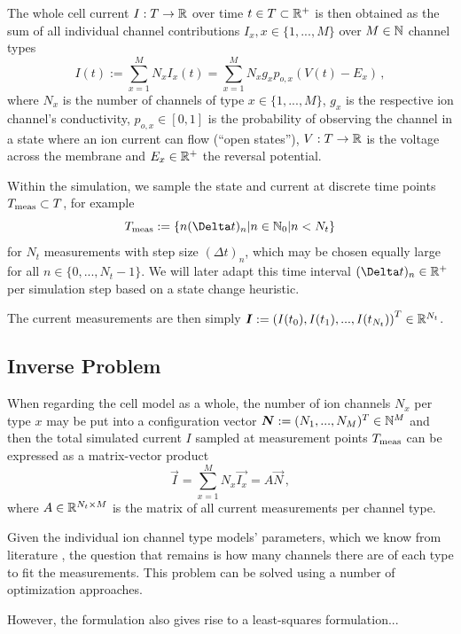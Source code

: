 \documentclass[USenglish,twocolumn]{article}
\begin{document}
  The whole cell current $I: T \rightarrow \mathbb{R}$ over time $t \in T \subset \mathbb{R}^+$ is then obtained as the sum of all individual channel contributions $I_x, x \in \{1, ..., M\}$ over $M \in \mathbb{N}$ channel types
  \begin{equation}
    I(t) := \sum_{x=1}^{M} N_x I_x(t) = \sum_{x=1}^{M} N_x g_x p_{o,x} (V(t)-E_x)\,,
  \end{equation}
  where $N_x$ is the number of channels of type $x \in \{1, ..., M\}$, $g_x$ is the respective ion channel's conductivity, $p_{o, x} \in [0, 1]$ is the probability of observing the channel in a state where an ion current can flow (``open states''), $V: T \rightarrow \mathbb{R}$ is the voltage across the membrane and $E_x \in \mathbb{R}^+$ the reversal potential.

  Within the simulation, we sample the state and current at discrete time points $T_{\rm meas} \subset T$, for example
  $$T_{\rm meas} := \{n (\Delta t)_n | n \in \N_0 | n < N_t\}$$
  for $N_t$ measurements with step size $(\Delta t)_n$, which may be chosen equally large for all $n \in \{0, ..., N_t - 1\}$.
  We will later adapt this time interval $(\Delta t)_n \in \R^+$ per simulation step based on a state change heuristic.

  The current measurements are then simply ${\bm{I}} := \left(I(t_0), I(t_1), ..., I(t_{N_t})\right)^T \in \mathbb{R}^{N_t}$.

  \subsection{Inverse Problem}
  When regarding the cell model as a whole, the number of ion channels $N_x$ per type $x$ may be put into a configuration vector ${\bm{N}} := (N_1, ..., N_M)^T \in \mathbb{N}^M$ and then the total simulated current $I$ sampled at measurement points $T_{\rm meas}$ can be expressed as a matrix-vector product
  \begin{equation}
    \vec{I} = \sum_{x=1}^{M} N_x \vec{I_x} = A \vec{N}\,,
    \label{eq:matrix-formulation}
  \end{equation}
  where $A \in \mathbb{R}^{N_t \times M}$ is the matrix of all current measurements per channel type.

  Given the individual ion channel type models' parameters, which we know from literature , the question that remains is how many channels there are of each type to fit the measurements.
  This problem can be solved using a number of optimization approaches.

  However, the formulation  also gives rise to a least-squares formulation...
\end{document}
